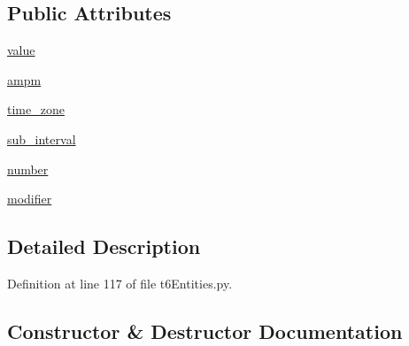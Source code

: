 \subsection*{Public Attributes}
\begin{DoxyCompactItemize}
\item 
\hyperlink{classtask6_1_1t6Entities_1_1T6HourOfDayEntity_aca30067d70324692cc16ad71cc422dec}{value}
\item 
\hyperlink{classtask6_1_1t6Entities_1_1T6HourOfDayEntity_a79df4da1e3285cf9c75ca102c631bd71}{ampm}
\item 
\hyperlink{classtask6_1_1t6Entities_1_1T6HourOfDayEntity_ac288e691b6a5181108729f0f1d8c0e84}{time\+\_\+zone}
\item 
\hyperlink{classtask6_1_1t6Entities_1_1T6HourOfDayEntity_afe660c17ee2ca754246bf4b931361e4b}{sub\+\_\+interval}
\item 
\hyperlink{classtask6_1_1t6Entities_1_1T6HourOfDayEntity_a9f57727fe8828f891028e9e0f856236d}{number}
\item 
\hyperlink{classtask6_1_1t6Entities_1_1T6HourOfDayEntity_ab670222d263a06375a37059e8bb8026d}{modifier}
\end{DoxyCompactItemize}


\subsection{Detailed Description}


Definition at line 117 of file t6\+Entities.\+py.



\subsection{Constructor \& Destructor Documentation}
\mbox{\label{classtask6_1_1t6Entities_1_1T6HourOfDayEntity_a0a375307b245c7408ae1bbaec1585dc1}} 

